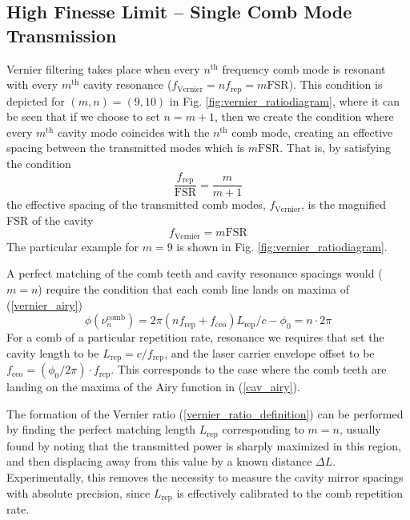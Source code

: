 \documentclass[8pt,a4paper]{report}
\begin{document}
	\subsection{High Finesse Limit -- Single Comb Mode Transmission}
	
	Vernier filtering \cite{vernier_gohle} takes place when every $n^\mathrm{th}$ frequency comb mode is resonant with every $m^\mathrm{th}$ cavity resonance ($f_\mathrm{Vernier} = nf_\mathrm{rep} = m \mathrm{FSR}$). This condition is depicted for $(m,n) = (9, 10)$ in Fig. \ref{fig:vernier_ratiodiagram}, where it can be seen that if we choose to set $n = m + 1$, then we create the condition where every $m^\mathrm{th}$ cavity mode coincides with the $n^\mathrm{th}$ comb mode, creating an effective spacing between the transmitted modes which is $m \mathrm{FSR}$. That is, by satisfying the condition
	\begin{equation} \label{vernier_ratio_definition}
		\frac{f_\mathrm{rep}}{\mathrm{FSR}} = \frac{m}{m+1}
	\end{equation}
	the effective spacing of the transmitted comb modes, $f_\mathrm{Vernier}$, is the magnified FSR of the cavity
	\begin{equation}
		f_\mathrm{Vernier} = m \mathrm{FSR}
	\end{equation}
	The particular example for $m=9$ is shown in Fig. \ref{fig:vernier_ratiodiagram}.
	
	
	
	A perfect matching of the comb teeth and cavity resonance spacings would ($m=n$) require the condition that each comb line lands on maxima of (\ref{vernier_airy})
	\begin{equation}
		\phi(\nu^\mathrm{comb}_n) = 2\pi (n f_\text{rep} + f_\text{ceo}) L_\text{rep}/c - \phi_0 =  n \cdot 2 \pi
	\end{equation}
	For a comb of a particular repetition rate, resonance we requires that set the cavity length to be $L_\text{rep} = c/f_\text{rep}$, and the laser carrier envelope offset to be $f_\text{ceo} = (\phi_0/2\pi)\cdot f_\text{rep}$. This corresponds to the case where the comb teeth are landing on the maxima of the Airy function in (\ref{cav_airy}).
	
	The formation of the Vernier ratio (\ref{vernier_ratio_definition}) can be performed by finding the perfect matching length $L_\mathrm{rep}$ corresponding to $m=n$, usually found by noting that the transmitted power is sharply maximized in this region, and then displacing away from this value by a known distance $\Delta L$. Experimentally, this removes the necessity to measure the cavity mirror spacings with absolute precision, since $L_\mathrm{rep}$ is effectively calibrated to the comb repetition rate.
	
\end{document}
